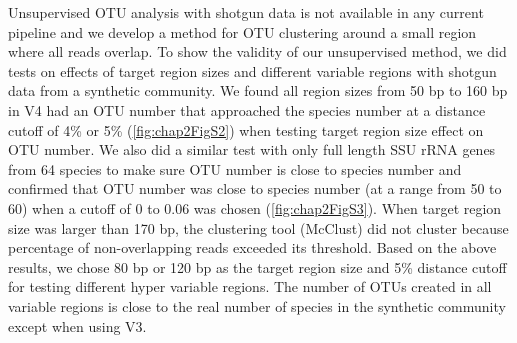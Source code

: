 \documentclass[]{msu-thesis}
\begin{document}
Unsupervised OTU analysis with shotgun data is not available in any current pipeline and we develop a method for OTU clustering around a small region where all reads overlap. To show the validity of our unsupervised method, we did tests on effects of target region sizes and different variable regions with shotgun data from a synthetic community. We found all region sizes from 50 bp to 160 bp in V4 had an OTU number that approached the species number at a distance cutoff of 4\% or 5\% (\cref{fig:chap2FigS2}) when testing target region size effect on OTU number. We also did a similar test with only full length SSU rRNA genes from 64 species to make sure OTU number is close to species number and confirmed that OTU number was close to species number (at a range from 50 to 60) when a cutoff of 0 to 0.06 was chosen (\cref{fig:chap2FigS3}). When target region size was larger than 170 bp, the clustering tool (McClust) \cite{cole_ribosomal_2014} did not cluster because percentage of non-overlapping reads exceeded its threshold. Based on the above results, we chose 80 bp or 120 bp as the target region size and 5\% distance cutoff for testing different hyper variable regions. The number of OTUs created in all variable regions is close to the real number of species in the synthetic community except when using V3.


\end{document}
